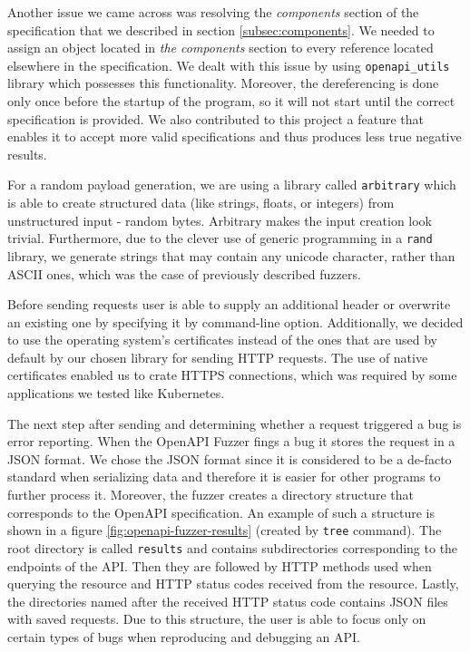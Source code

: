 Another issue we came across was resolving the \textit{components} section of the specification that we described in section \ref{subsec:components}. We needed to assign an object located in \textit{the components} section to every reference located elsewhere in the specification. We dealt with this issue by using \texttt{openapi\_utils} \cite{openapiutils2020github} library which possesses this functionality. Moreover, the dereferencing is done only once before the startup of the program, so it will not start until the correct specification is provided. We also contributed to this project a feature that enables it to accept more valid specifications and thus produces less true negative results.

For a random payload generation, we are using a library called \texttt{arbitrary} \cite{arbitrary2020github} which is able to create structured data (like strings, floats, or integers) from unstructured input - random bytes. Arbitrary makes the input creation look trivial. Furthermore, due to the clever use of generic programming in a \texttt{rand} library, \cite{rand2020github} we generate strings that may contain any unicode character, rather than ASCII ones, which was the case of previously described fuzzers.

Before sending requests user is able to supply an additional header or overwrite an existing one by specifying it by command-line option. Additionally, we decided to use the operating system's certificates instead of the ones that are used by default by our chosen library for sending HTTP requests. The use of native certificates enabled us to crate HTTPS connections, which was required by some applications we tested like Kubernetes.

The next step after sending and determining whether a request triggered a bug is error reporting. When the OpenAPI Fuzzer fings a bug it stores the request in a JSON format. We chose the JSON format since it is considered to be a de-facto standard when serializing data and therefore it is easier for other programs to further process it. Moreover, the fuzzer creates a directory structure that corresponds to the OpenAPI specification. An example of such a structure is shown in a figure \ref{fig:openapi-fuzzer-results} (created by \texttt{tree} command). The root directory is called \texttt{results} and contains subdirectories corresponding to the endpoints of the API. Then they are followed by HTTP methods used when querying the resource and HTTP status codes received from the resource. Lastly, the directories named after the received HTTP status code contains JSON files with saved requests. Due to this structure, the user is able to focus only on certain types of bugs when reproducing and debugging an API.

